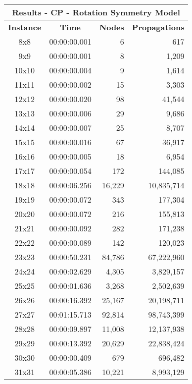 
\begin{center}
    \begin{tabular}{|c|c|r|r|}
        \hline
        \multicolumn{4}{|c|}{\textbf{Results - CP - Rotation Symmetry Model}} \\
        \hline
        \textbf{Instance} & \textbf{Time} & \textbf{Nodes} & \textbf{Propagations} \\
        
        \hline
		8x8 & 00:00:00.001 & 6 & 617 \\ \hline
		9x9 & 00:00:00.001 & 8 & 1,209 \\ \hline
		10x10 & 00:00:00.004 & 9 & 1,614 \\ \hline
		11x11 & 00:00:00.002 & 15 & 3,303 \\ \hline
		12x12 & 00:00:00.020 & 98 & 41,544 \\ \hline
		13x13 & 00:00:00.006 & 29 & 9,686 \\ \hline
		14x14 & 00:00:00.007 & 25 & 8,707 \\ \hline
		15x15 & 00:00:00.016 & 67 & 36,917 \\ \hline
		16x16 & 00:00:00.005 & 18 & 6,954 \\ \hline
		17x17 & 00:00:00.054 & 172 & 144,085 \\ \hline
		18x18 & 00:00:06.256 & 16,229 & 10,835,714 \\ \hline
		19x19 & 00:00:00.072 & 343 & 177,304 \\ \hline
		20x20 & 00:00:00.072 & 216 & 155,813 \\ \hline
		21x21 & 00:00:00.092 & 282 & 171,238 \\ \hline
		22x22 & 00:00:00.089 & 142 & 120,023 \\ \hline
		23x23 & 00:00:50.231 & 84,786 & 67,222,960 \\ \hline
		24x24 & 00:00:02.629 & 4,305 & 3,829,157 \\ \hline
		25x25 & 00:00:01.636 & 3,268 & 2,502,639 \\ \hline
		26x26 & 00:00:16.392 & 25,167 & 20,198,711 \\ \hline
		27x27 & 00:01:15.713 & 92,814 & 98,743,399 \\ \hline
		28x28 & 00:00:09.897 & 11,008 & 12,137,938 \\ \hline
		29x29 & 00:00:13.392 & 20,629 & 22,838,424 \\ \hline
		30x30 & 00:00:00.409 & 679 & 696,482 \\ \hline
		31x31 & 00:00:05.386 & 10,221 & 8,993,129 \\ \hline

\end{tabular}
\end{center}
